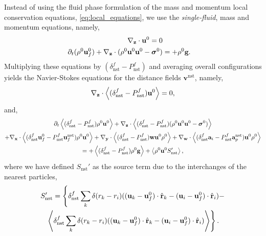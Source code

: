 Instead of using the fluid phase formulation of the mass and momentum local conservation equations, \eqref{eq:local_equations}, we use the \textit{single-fluid}, mass and momentum equations, namely, 
\begin{align}
    \pddz \cdot \textbf{u}^0 = 0 \\
    \pddt (\rho^0\textbf{u}^0_f)
    + \pddz\cdot 
    (\rho^0\textbf{u}^0\textbf{u}^0 
    -\bm\sigma^0)
    &= 
    + \rho^0 \textbf{g}. 
    \label{eq:local_equations_bulk}
\end{align}
Multiplying these equations by $(\delta_\text{nst}^f - P_\text{nst}^f)$ and averaging overall configurations yields the Navier-Stokes equations for the distance fields $\textbf{v}^\text{nst}$, namely,
\begin{equation}
    \pddz \cdot \avg{(\delta_\text{nst}^f - P_\text{nst}^f) \textbf{u}^0}
    = 0,
    \label{eq:mass_nst_d}
\end{equation}
and,
\begin{multline}
    \pddt \avg{(\delta_\text{nst}^f - P_\text{nst}^f)\rho^0\textbf{u}^0}
    + \pddz\cdot \avg{ (\delta_\text{nst}^f - P_\text{nst}^f) ( \rho^0  \textbf{u}^0 \textbf{u}^0 - \bm\sigma^0)}\\
    +  \pddx \cdot \avg{(\delta_\text{nst}^f \textbf{u}_f^0 - P_\text{nst}^f\textbf{u}_f^\text{nst}) \rho^0 \textbf{u}^0}
    +  \pddy \cdot \avg{(\delta_\text{nst}^f - P_\text{nst}^f) \textbf{w} \textbf{u}^0 \rho^0}
    +  \pddw \cdot \avg{(\delta_\text{nst}^f \textbf{a}_i - P_\text{nst}^f \textbf{a}_p^\text{nst})\textbf{u}^0 \rho^0 }\\
    = 
    + \avg{(\delta_\text{nst}^f - P_\text{nst}^f)\rho^0 \textbf{g}} 
    + 
    \avg{\rho^0 \textbf{u}^0 S'_\text{nst} },
    \label{eq:momentum_nst_d}
\end{multline}
where we have defined $S_\text{nst}'$ as the source term due to the interchanges of the nearest particles,
\begin{multline}
    S_\text{nst}'
    =
    \left\{
    \delta_\text{nst}^f
        \sum_k 
        \delta(r_k - r_i)
        ((\textbf{u}_k - \textbf{u}_f^0) \cdot \hat{\textbf{r}}_k - (\textbf{u}_i  - \textbf{u}_f^0)\cdot \hat{\textbf{r}}_i) 
    - \right.\\ \left.
    \left<
         \delta_\text{nst}^f
        \sum_k 
        \delta(r_k - r_i)
        ((\textbf{u}_k - \textbf{u}_f^0) \cdot \hat{\textbf{r}}_k - (\textbf{u}_i  - \textbf{u}_f^0)\cdot \hat{\textbf{r}}_i) 
    \right>
    \right\}. 
\end{multline}
